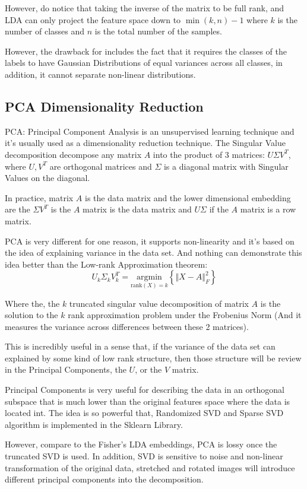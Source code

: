 \documentclass{article}
\begin{document}
        \par
        However, do notice that taking the inverse of the matrix to be full rank, and LDA can only project the feature space down to $\min(k, n) - 1$ where $k$ is the number of classes and $n$ is the total number of the samples. 
        \par
        However, the drawback for includes the fact that it requires the classes of the labels to have Gaussian Distributions of equal variances across all classes, in addition, it cannot separate non-linear distributions. %
    \subsection*{PCA Dimensionality Reduction}
        \hspace{1.1em}
        PCA: Principal Component Analysis is an unsupervised learning technique and it's usually used as a dimensionality reduction technique. The Singular Value decomposition decompose any matrix $A$ into the product of 3 matrices: $U\Sigma V^T$, where $U, V^T$ are orthogonal matrices and $\Sigma$ is a diagonal matrix with Singular Values on the diagonal. 
        \par
        In practice, matrix $A$ is the data matrix and the lower dimensional embedding are the $\Sigma V^T$ is the $A$ matrix is the data matrix and $U\Sigma$ if the $A$ matrix is a row matrix. 
        \par
        PCA is very different for one reason, it supports non-linearity and it's based on the idea of explaining variance in the data set. And nothing can demonstrate this idea better than the Low-rank Approximation theorem: 
        \begin{equation*}\tag{5}\label{eqn:5}
            U_k\Sigma_k V^T_k = \underset{\text{rank}(X)=k}{\text{argmin}}  \left\lbrace
                \Vert X - A\Vert_F^2
            \right\rbrace
        \end{equation*}
        \par
        Where the, the $k$ truncated singular value decomposition of matrix $A$ is the solution to the $k$ rank approximation problem under the Frobenius Norm (And it measures the variance across differences between these 2 matrices). 
        \par
        This is incredibly useful in a sense that, if the variance of the data set can explained by some kind of low rank structure, then those structure will be review in the Principal Components, the $U$, or the $V$ matrix. 
        \par
        Principal Components is very useful for describing the data in an orthogonal subspace that is much lower than the original features space where the data is located int. The idea is so powerful that, Randomized SVD and Sparse SVD algorithm is implemented in the Sklearn Library. %
        \par
        However, compare to the Fisher's LDA embeddings, PCA is lossy once the truncated SVD is used. In addition, SVD is sensitive to noise and non-linear transformation of the original data, stretched and rotated images will introduce different principal components into the decomposition.
\end{document}
